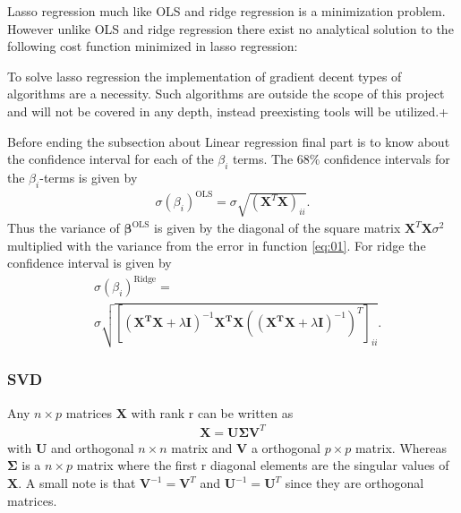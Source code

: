 \documentclass[uio,jmp,amsmath,amssymb,reprint,nofootinbib]{revtex4-1}
\numberwithin{equation}{section}
\newcommand{\lp}{\left(}
\newcommand{\rp}{\right)}
\newcommand{\lsb}{\left[}
\newcommand{\rsb}{\right]}
\begin{document}
Lasso regression much like OLS and ridge regression is a minimization problem. However unlike OLS and ridge regression there exist no analytical solution to the following cost function minimized in lasso regression:


To solve lasso regression the implementation of gradient decent types of algorithms are a necessity. Such algorithms are outside the scope of this project and will not be covered in any depth, instead preexisting tools will be utilized.+

Before ending the subsection about Linear regression final part is to know about the confidence interval for each of the \(\beta_i\) terms. The \(68\%\) confidence intervals for the \(\beta_i\)-terms is given by
\begin{align}\label{eq:12}
\sigma(\beta_i)^{\text{OLS}} = \sigma\sqrt{(\bm{X}^T\bm{X})_{ii}}.
\end{align}
Thus the variance of \(\bm{\beta}^{\text{OLS}}\) is given by the diagonal of the square matrix \(\bm{X}^T\bm{X}\sigma^2\) multiplied with the variance from the error in function \ref{eq:01}. For ridge the confidence interval is given by
\begin{align*}
&\sigma(\beta_i)^{\text{Ridge}} = \\
&\sigma\sqrt{ \lsb\lp\bm{X^TX} + \lambda\bm{I}\rp^{-1}\bm{X^TX}\lp\lp\bm{X^TX} + \lambda\bm{I}\rp^{-1}\rp^T\rsb_{ii} }.
\end{align*}

\subsubsection{SVD}

Any \(n\times p\) matrices \(\bm{X}\) with rank r can be written as
\begin{align}
\bm{X} = \bm{U\Sigma V}^T
\end{align}
with \(\bm{U}\) and orthogonal \({n\times n}\) matrix and \(\bm{V}\) a orthogonal \({p\times p}\) matrix. Whereas \(\bm{\Sigma}\) is a \(n\times p\) matrix where the first r diagonal elements are the singular values of \(\bm{X}\). A small note is that \(\bm{V}^{-1} = \bm{V}^T\) and \(\bm{U}^{-1} = \bm{U}^T\) since they are orthogonal matrices.
\end{document}
